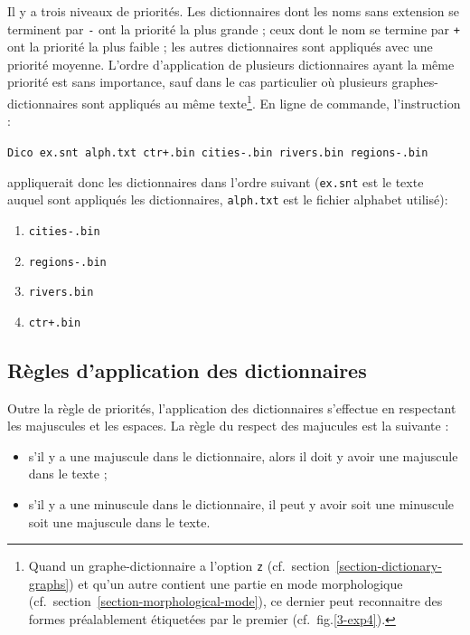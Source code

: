 
\bigskip
\noindent Il y a trois niveaux de priorités. Les dictionnaires dont les noms sans extension se
terminent par \verb+-+\index{\verbc{-}}\index{\verbc{+}} ont la priorité la plus grande ; ceux dont
le nom se termine par \verb-+- ont la priorité la plus faible ; les autres dictionnaires sont
appliqués avec une priorité moyenne. L’ordre d’application de plusieurs dictionnaires ayant la même
priorité est sans importance, sauf dans le cas particulier où plusieurs graphes-dictionnaires sont
appliqués au même texte\footnote{Quand un graphe-dic\-tion\-naire a l'option \texttt{z}
(cf.~section~\ref{section-dictionary-graphs}) et qu'un autre contient une partie en mode
morphologique (cf.~section~\ref{section-morphological-mode}), ce dernier peut reconnaitre des
formes préalablement étiquetées par le premier (cf.~fig.\ref{3-exp4}).}. En ligne de commande, l’instruction :

\bigskip
\noindent
\verb$Dico ex.snt alph.txt ctr+.bin cities-.bin rivers.bin regions-.bin$

\bigskip \noindent appliquerait donc les dictionnaires dans l’ordre suivant (\verb+ex.snt+ est le
texte auquel sont appliqués les dictionnaires, \verb+alph.txt+ est le fichier alphabet utilisé):

\begin{enumerate}
  \item \verb$cities-.bin$
  \item \verb$regions-.bin$
  \item \verb$rivers.bin$
  \item \verb$ctr+.bin$
\end{enumerate}

\subsection{Règles d’application des dictionnaires}
\label{section-transducer-application-rules}

Outre la règle de priorités, l’application des dictionnaires s’effectue en respectant les
majuscules et les espaces. La règle du respect des majucules est la suivante :


\begin{itemize}
  \item s’il y a une majuscule dans le dictionnaire, alors il doit y avoir une majuscule dans le
texte ;

  \item s’il y a une minuscule dans le dictionnaire, il peut y avoir soit une minuscule soit une
majuscule dans le texte.

\end{itemize}

